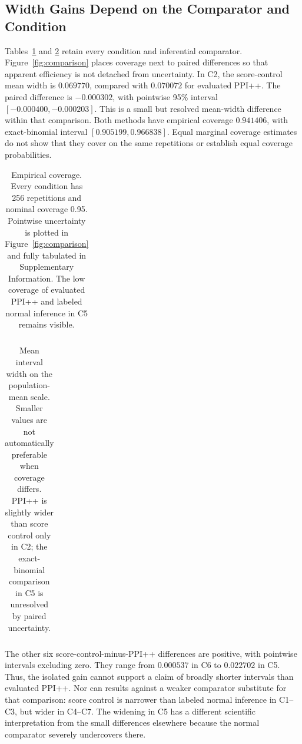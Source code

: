 \documentclass{article}
\begin{document}
\subsection{Width Gains Depend on the Comparator and Condition}
Tables~\ref{tab:coverage} and \ref{tab:width} retain every condition and inferential comparator. Figure~\ref{fig:comparison} places coverage next to paired differences so that apparent efficiency is not detached from uncertainty. In C2, the score-control mean width is $0.069770$, compared with $0.070072$ for evaluated PPI++. The paired difference is $-0.000302$, with pointwise 95\% interval $[-0.000400,-0.000203]$. This is a small but resolved mean-width difference within that comparison. Both methods have empirical coverage $0.941406$, with exact-binomial interval $[0.905199,0.966838]$. Equal marginal coverage estimates do not show that they cover on the same repetitions or establish equal coverage probabilities.

\begin{table}[t]
\centering
\caption{Empirical coverage. Every condition has 256 repetitions and nominal coverage 0.95. Pointwise uncertainty is plotted in Figure~\ref{fig:comparison} and fully tabulated in Supplementary Information. The low coverage of evaluated PPI++ and labeled normal inference in C5 remains visible.}
\label{tab:coverage}
\small
\begin{tabular}{lrrrrr}
\toprule

\end{tabular}
\end{table}

\begin{table}[t]
\centering
\caption{Mean interval width on the population-mean scale. Smaller values are not automatically preferable when coverage differs. PPI++ is slightly wider than score control only in C2; the exact-binomial comparison in C5 is unresolved by paired uncertainty.}
\label{tab:width}
\small
\begin{tabular}{lrrrrr}
\toprule

\end{tabular}
\end{table}

The other six score-control-minus-PPI++ differences are positive, with pointwise intervals excluding zero. They range from $0.000537$ in C6 to $0.022702$ in C5. Thus, the isolated gain cannot support a claim of broadly shorter intervals than evaluated PPI++. Nor can results against a weaker comparator substitute for that comparison: score control is narrower than labeled normal inference in C1--C3, but wider in C4--C7. The widening in C5 has a different scientific interpretation from the small differences elsewhere because the normal comparator severely undercovers there.
\end{document}
